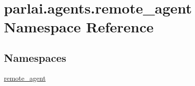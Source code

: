 \hypertarget{namespaceparlai_1_1agents_1_1remote__agent}{}\section{parlai.\+agents.\+remote\+\_\+agent Namespace Reference}
\label{namespaceparlai_1_1agents_1_1remote__agent}
\subsection*{Namespaces}
\begin{DoxyCompactItemize}
\item 
 \hyperlink{namespaceparlai_1_1agents_1_1remote__agent_1_1remote__agent}{remote\+\_\+agent}
\end{DoxyCompactItemize}
